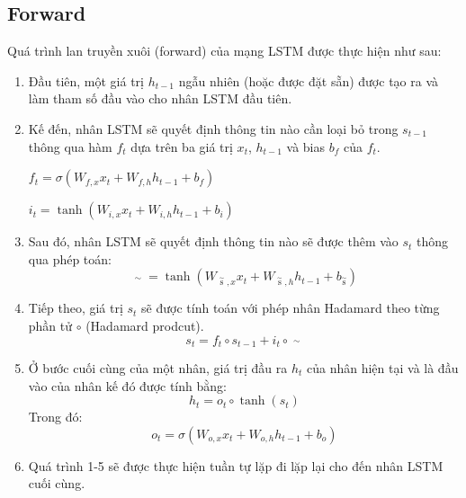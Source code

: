 \subsection*{Forward}

Quá trình lan truyền xuôi (forward) của mạng LSTM được thực hiện như sau:
\begin{enumerate}
	\item Đầu tiên, một giá trị $ h_{t-1} $ ngẫu nhiên (hoặc được đặt sẵn) được tạo ra và làm tham số đầu vào cho nhân LSTM đầu tiên.
	\item Kế đến, nhân LSTM sẽ quyết định thông tin nào cần loại bỏ trong $ s_{t-1} $ thông qua hàm $ f_t $ dựa trên ba giá trị $ x_t $, $ h_{t-1} $ và bias $ b_f $ của $ f_t $. 
	\begin{center}
		$ {f_t} = \sigma \left( {{W_{f,x}}{x_t} + {W_{f,h}}{h_{t - 1}} + {b_f}} \right) $
		
		$
		i_t = \tanh ( W_{i,x}x_t + W_{i,h}h_{t - 1} + b_i)
		$
	\end{center}
	\item Sau đó, nhân LSTM sẽ quyết định thông tin nào sẽ được thêm vào $ s_t $ thông qua phép toán:
	\begin{equation}
	\mathop {{s_t}}\limits^ \sim   = \tanh \left( {{W_{\mathop s\limits^ \sim  ,x}}{x_t} + {W_{\mathop s\limits^ \sim  ,h}}{h_{t - 1}} + {b_{\mathop s\limits^ \sim  }}} \right)
	\end{equation}
	\item Tiếp theo, giá trị $ s_t $ sẽ được tính toán với phép nhân Hadamard theo từng phần tử $\circ$ (Hadamard prodcut).
	\begin{equation}
	{s_t} = {f_t} \circ {s_{t - 1}} + {i_t} \circ \mathop {{s_t}}\limits^ \sim
	\end{equation}
	\item Ở bước cuối cùng của một nhân, giá trị đầu ra $ h_t $ của nhân hiện tại và là đầu vào của nhân kế đó được tính bằng:
	\begin{equation}
	{h_t} = {o_t} \circ \tanh \left( {{s_t}} \right)
	\end{equation}
	Trong đó:
	\begin{equation}
	{o_t} = \sigma \left( {{W_{o,x}}{x_t} + {W_{o,h}}{h_{t - 1}} + {b_o}} \right)
	\end{equation}
	\item Quá trình 1-5 sẽ được thực hiện tuần tự lặp đi lặp lại cho đến nhân LSTM cuối cùng.
\end{enumerate}
